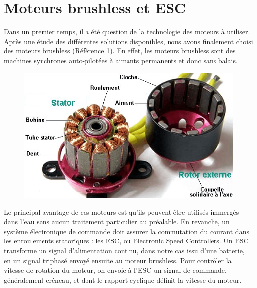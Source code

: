 \documentclass[a4paper,11pt]{report}
\begin{document}
				\section{Moteurs brushless et ESC} 
				
							Dans un premier temps, il a été question de la technologie des moteurs à utiliser. Après une étude des différentes solutions disponibles, nous avons finalement choisi des moteurs brushless (\href{http://www.conrad.fr/ce/fr/product/231891/Moteur-davion-lectrique-brushless-ROXXY-315079?ref=searchDetail}{Référence 1}). En effet, les moteurs brushless sont des machines synchrones auto-pilotées à aimants permanents et donc sans balais. \newline
			\begin{figure}[!h]
				\begin{center}
					\includegraphics{Photos/moteur-brushless}
				\end{center}
			\end{figure}\newline
							Le principal avantage de ces moteurs est qu'ils peuvent être utilisés immergés dans l'eau sans aucun traitement particulier au préalable. En revanche, un système électronique de commande doit assurer la commutation du courant dans les enroulements statoriques : les ESC, ou Electronic Speed Controllers.
			Un ESC transforme un signal d'alimentation continu, dans notre cas issu d'une batterie, en un signal triphasé envoyé ensuite au moteur brushless. Pour contrôler la vitesse de rotation du moteur, on envoie à l'ESC un signal de commande, généralement créneau, et dont le rapport cyclique définit la vitesse du moteur. 
\end{document}

